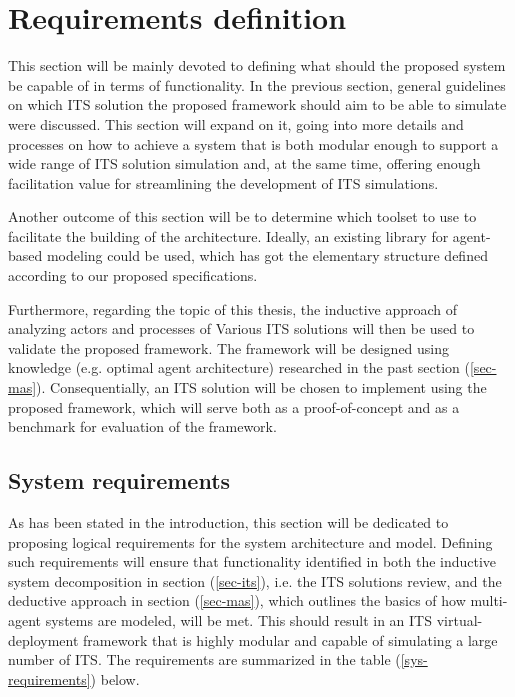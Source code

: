 \documentclass[main.tex]{subfiles}
\begin{document}
\section{Requirements definition}\label{sec-requirements}

This section will be mainly devoted to defining what should the proposed system be capable of in terms 
of functionality. In the previous section, general guidelines on which ITS solution the proposed 
framework should aim to be able to simulate were discussed. This section will expand on it, 
going into more details and processes on how to achieve a system that is both modular enough to support 
a wide range of ITS solution simulation and, at the same time, offering enough facilitation value 
for streamlining the development of ITS simulations. 

Another outcome of this section will be to determine which toolset to use to facilitate the building of 
the architecture. Ideally, an existing library for agent-based modeling could be used, which has got 
the elementary structure defined according to our proposed specifications.

Furthermore, regarding the topic of this thesis, the inductive approach of analyzing actors and
processes of Various ITS solutions will then be used to validate the proposed framework. The
framework will be designed using knowledge (e.g. optimal agent architecture) researched in the
past section (\ref{sec-mas}). Consequentially, an ITS solution will be chosen to implement
using the proposed framework, which will serve both as a proof-of-concept and as a benchmark
for evaluation of the framework.  

\subsection{System requirements}

As has been stated in the introduction, this section will be dedicated to proposing logical
requirements for the system architecture and model. Defining such requirements will ensure that
functionality identified in both the inductive system decomposition in section (\ref{sec-its}),
i.e. the ITS solutions review, and the deductive approach in section (\ref{sec-mas}), which 
outlines the basics of how multi-agent systems are modeled, will be met. This should result 
in an ITS virtual-deployment framework that is highly modular and capable of simulating a large 
number of ITS. The requirements are summarized in the table (\ref{sys-requirements}) below.
\end{document}
